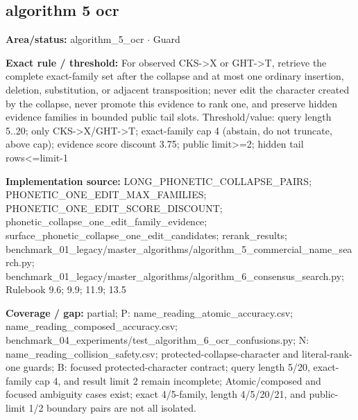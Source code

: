 \subsection*{algorithm 5 ocr}
\begin{tcolorbox}[enhanced,breakable,colback=white,colframe=Muted!45,boxrule=0.45pt,arc=1.5pt,left=6pt,right=6pt,top=5pt,bottom=5pt,title={\texttt{A5-PHONETIC-COLLAPSE-13A}},title after break={\texttt{A5-PHONETIC-COLLAPSE-13A}\ (continued)},fonttitle=\headingfont\bfseries\color{Navy},coltitle=Navy]
\textbf{Area/status:} algorithm\_\allowbreak{}5\_\allowbreak{}ocr $\boldsymbol{\cdot}$ Guard\par
\smallskip
\textbf{Exact rule / threshold:} For observed CKS->X or GHT->T, retrieve the complete exact-family set after the collapse and at most one ordinary insertion, deletion, substitution, or adjacent transposition; never edit the character created by the collapse, never promote this evidence to rank one, and preserve hidden evidence families in bounded public tail slots. Threshold/\allowbreak{}value: query length 5..20; only CKS->X/\allowbreak{}GHT->T; exact-family cap 4 (abstain, do not truncate, above cap); evidence score discount 3.75; public limit>=2; hidden tail rows<=limit-1\par
\smallskip
\textbf{Implementation source:} LONG\_\allowbreak{}PHONETIC\_\allowbreak{}COLLAPSE\_\allowbreak{}PAIRS; PHONETIC\_\allowbreak{}ONE\_\allowbreak{}EDIT\_\allowbreak{}MAX\_\allowbreak{}FAMILIES; PHONETIC\_\allowbreak{}ONE\_\allowbreak{}EDIT\_\allowbreak{}SCORE\_\allowbreak{}DISCOUNT; phonetic\_\allowbreak{}collapse\_\allowbreak{}one\_\allowbreak{}edit\_\allowbreak{}family\_\allowbreak{}evidence; surface\_\allowbreak{}phonetic\_\allowbreak{}collapse\_\allowbreak{}one\_\allowbreak{}edit\_\allowbreak{}candidates; rerank\_\allowbreak{}results; benchmark\_\allowbreak{}01\_\allowbreak{}legacy/\allowbreak{}master\_\allowbreak{}algorithms/\allowbreak{}algorithm\_\allowbreak{}5\_\allowbreak{}commercial\_\allowbreak{}name\_\allowbreak{}search.py; benchmark\_\allowbreak{}01\_\allowbreak{}legacy/\allowbreak{}master\_\allowbreak{}algorithms/\allowbreak{}algorithm\_\allowbreak{}6\_\allowbreak{}consensus\_\allowbreak{}search.py; Rulebook 9.6; 9.9; 11.9; 13.5\par
\smallskip
\textbf{Coverage / gap:} partial; P: name\_\allowbreak{}reading\_\allowbreak{}atomic\_\allowbreak{}accuracy.csv; name\_\allowbreak{}reading\_\allowbreak{}composed\_\allowbreak{}accuracy.csv; benchmark\_\allowbreak{}04\_\allowbreak{}experiments/\allowbreak{}test\_\allowbreak{}algorithm\_\allowbreak{}6\_\allowbreak{}ocr\_\allowbreak{}confusions.py; N: name\_\allowbreak{}reading\_\allowbreak{}collision\_\allowbreak{}safety.csv; protected-collapse-character and literal-rank-one guards; B: focused protected-character contract; query length 5/\allowbreak{}20, exact-family cap 4, and result limit 2 remain incomplete; Atomic/\allowbreak{}composed and focused ambiguity cases exist; exact 4/\allowbreak{}5-family, length 4/\allowbreak{}5/\allowbreak{}20/\allowbreak{}21, and public-limit 1/\allowbreak{}2 boundary pairs are not all isolated.
\end{tcolorbox}
\medskip
